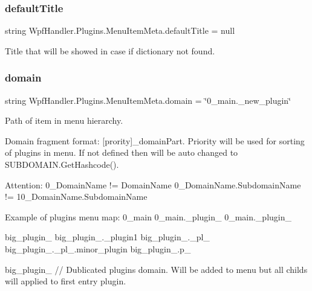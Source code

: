 \subsubsection{\texorpdfstring{default\+Title}{defaultTitle}}
{\footnotesize\ttfamily string Wpf\+Handler.\+Plugins.\+Menu\+Item\+Meta.\+default\+Title = null}



Title that will be showed in case if dictionary not found. 

\mbox{\label{class_wpf_handler_1_1_plugins_1_1_menu_item_meta_a029f2a5b3bfe5165d6e00ae76afed48e}} 
\subsubsection{\texorpdfstring{domain}{domain}}
{\footnotesize\ttfamily string Wpf\+Handler.\+Plugins.\+Menu\+Item\+Meta.\+domain = \char`\"{}0\+\_\+main.\+\_\+new\+\_\+plugin\char`\"{}}



Path of item in menu hierarchy. 

Domain fragment format\+: \mbox{[}prority\mbox{]}\+\_\+domain\+Part. Priority will be used for sorting of plugins in menu. If not defined then will be auto changed to S\+U\+B\+D\+O\+M\+A\+I\+N.\+Get\+Hashcode(). 

Attention\+: 0\+\_\+\+Domain\+Name != Domain\+Name 0\+\_\+\+Domain\+Name.\+Subdomain\+Name != 10\+\_\+\+Domain\+Name.\+Subdomain\+Name

Example of plugins menu map\+: 0\+\_\+main 0\+\_\+main.\+\_\+plugin\+\_ 0\+\_\+main.\+\_\+plugin\+\_

big\+\_\+plugin\+\_ big\+\_\+plugin\+\_.\+\_\+plugin1 big\+\_\+plugin\+\_.\+\_\+pl\+\_ big\+\_\+plugin\+\_.\+\_\+pl\+\_.\+minor\+\_\+plugin big\+\_\+plugin\+\_.\+p\+\_

big\+\_\+plugin\+\_ // Dublicated plugin\textquotesingle{}s domain. Will be added to menu but all childs will applied to first entry plugin. \mbox{\label{class_wpf_handler_1_1_plugins_1_1_menu_item_meta_ad86b56cff5215164499143cf088c2bf8}} 
